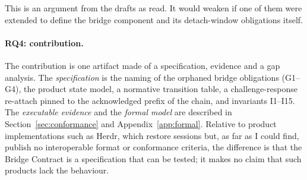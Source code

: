 This is an argument from the drafts as read. It would weaken if one of
them were extended to define the bridge component and its detach-window
obligations itself.

\paragraph{RQ4: contribution.} The contribution is one artifact made of a
specification, evidence and a gap analysis. The \emph{specification} is the naming of the orphaned bridge
obligations (G1--G4), the product state model, a normative transition
table, a challenge-response re-attach pinned to the acknowledged prefix of
the chain, and invariants I1--I15. The \emph{executable evidence} and the
\emph{formal model} are described in Section~\ref{sec:conformance} and
Appendix~\ref{app:formal}. Relative to
product implementations such as Herdr, which restore sessions but, as far as I could find, publish
no interoperable format or conformance criteria, the difference is that the Bridge
Contract is a specification that can be tested; it makes no claim that
such products lack the behaviour.

